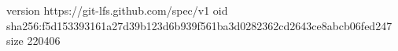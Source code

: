 version https://git-lfs.github.com/spec/v1
oid sha256:f5d153393161a27d39b123d6b939f561ba3d0282362cd2643ce8abcb06fed247
size 220406
